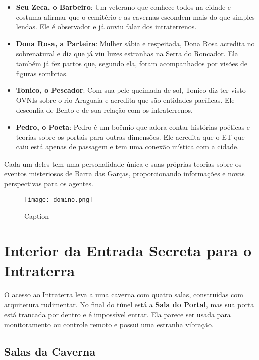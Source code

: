 \begin{personagem}[Personagens]
\begin{itemize}
    \item \textbf{Seu Zeca, o Barbeiro}: Um veterano que conhece todos na cidade e costuma afirmar que o cemitério e as cavernas escondem mais do que simples lendas. Ele é observador e já ouviu falar dos intraterrenos.
    \item \textbf{Dona Rosa, a Parteira}: Mulher sábia e respeitada, Dona Rosa acredita no sobrenatural e diz que já viu luzes estranhas na Serra do Roncador. Ela também já fez partos que, segundo ela, foram acompanhados por visões de figuras sombrias.
    \item \textbf{Tonico, o Pescador}: Com sua pele queimada de sol, Tonico diz ter visto OVNIs sobre o rio Araguaia e acredita que são entidades pacíficas. Ele desconfia de Bento e de sua relação com os intraterrenos.
    \item \textbf{Pedro, o Poeta}: Pedro é um boêmio que adora contar histórias poéticas e teorias sobre os portais para outras dimensões. Ele acredita que o ET que caiu está apenas de passagem e tem uma conexão mística com a cidade.
\end{itemize}
\end{personagem}

Cada um deles tem uma personalidade única e suas próprias teorias sobre os eventos misteriosos de Barra das Garças, proporcionando informações e novas perspectivas para os agentes.

\begin{figure}[hbt]
    \centering
    \texttt{[image: domino.png]}
    \caption{Caption}
    \label{fig:enter-label}
\end{figure}

\section{Interior da Entrada Secreta para o Intraterra}


O acesso ao Intraterra leva a uma caverna com quatro salas, construídas com arquitetura rudimentar. No final do túnel está a \textbf{Sala do Portal}, mas sua porta está trancada por dentro e é impossível entrar. Ela parece ser usada para monitoramento ou controle remoto e possui uma estranha vibração.

\subsection{Salas da Caverna}


